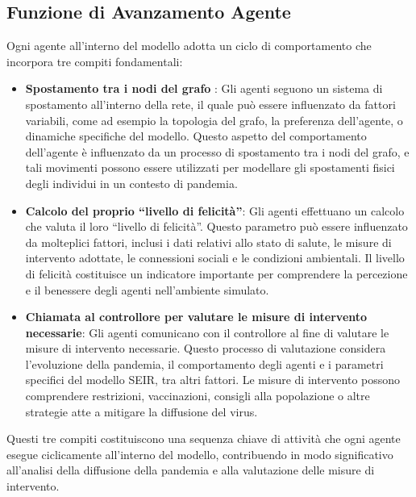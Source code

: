 \newpage

\subsection{Funzione di Avanzamento Agente}

Ogni agente all'interno del modello adotta un ciclo di comportamento che 
incorpora tre compiti fondamentali:

\begin{itemize}
	\item \textbf{Spostamento tra i nodi del grafo} \cite{Ding2021}: 
	Gli agenti seguono un sistema di spostamento all'interno della rete, 
	il quale può essere influenzato da fattori variabili, 
	come ad esempio la topologia del grafo, la preferenza dell'agente, 
	o dinamiche specifiche del modello. Questo aspetto del 
	comportamento dell'agente è influenzato da un processo di 
	spostamento tra i nodi del grafo, e tali movimenti possono essere 
	utilizzati per modellare gli spostamenti fisici degli individui in 
	un contesto di pandemia.
	\item \textbf{Calcolo del proprio ``livello di felicità''}: Gli agenti 
	effettuano un calcolo che valuta il loro ``livello di felicità''. 
	Questo parametro può essere influenzato da molteplici fattori, 
	inclusi i dati relativi allo stato di salute, le misure di 
	intervento adottate, le connessioni sociali e le condizioni 
	ambientali. Il livello di felicità costituisce un indicatore 
	importante per comprendere la percezione e il benessere degli 
	agenti nell'ambiente simulato.
	\item \textbf{Chiamata al controllore per valutare le misure 
	di intervento necessarie}: Gli agenti comunicano con il controllore 
	al fine di valutare le misure di intervento necessarie. 
	Questo processo di valutazione considera l'evoluzione della pandemia, 
	il comportamento degli agenti e i parametri specifici del modello SEIR, 
	tra altri fattori. Le misure di intervento possono comprendere 
	restrizioni, vaccinazioni, consigli alla popolazione o altre 
	strategie atte a mitigare la diffusione del virus.
\end{itemize}

Questi tre compiti costituiscono una sequenza chiave di attività che 
ogni agente esegue ciclicamente all'interno del modello, contribuendo 
in modo significativo all'analisi della diffusione della pandemia e 
alla valutazione delle misure di intervento.

